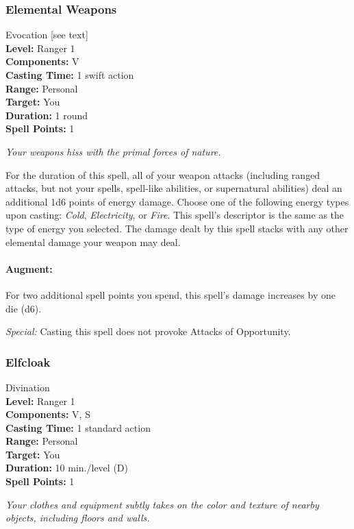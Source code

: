 \subsubsection{Elemental Weapons}
\label{Spell:ElementalWeapons}
Evocation [see text]
\\ \textbf{Level:} Ranger 1
\\ \textbf{Components:} V
\\ \textbf{Casting Time:} 1 swift action
\\ \textbf{Range:} Personal
\\ \textbf{Target:} You
\\ \textbf{Duration:} 1 round
\\ \textbf{Spell Points:} 1

\emph{Your weapons hiss with the primal forces of nature.}

For the duration of this spell, all of your weapon attacks (including ranged attacks, but not your spells, spell-like abilities, or supernatural abilities) deal an additional 1d6 points of energy damage. Choose one of the following energy types upon casting: \emph{Cold}, \emph{Electricity}, or \emph{Fire}.
This spell's descriptor is the same as the type of energy you selected. 
The damage dealt by this spell stacks with any other elemental damage your weapon may deal.

\paragraph{Augment:} For two additional spell points you spend, this spell's damage increases by one die (d6).

\emph{Special:} Casting this spell does not provoke Attacks of Opportunity.
\subsubsection{Elfcloak}
\label{Spell:Elfcloak}
Divination
\\ \textbf{Level:} Ranger 1
\\ \textbf{Components:} V, S
\\ \textbf{Casting Time:} 1 standard action
\\ \textbf{Range:} Personal
\\ \textbf{Target:} You
\\ \textbf{Duration:} 10 min./level (D)
\\ \textbf{Spell Points:} 1

\emph{Your clothes and equipment subtly takes on the color and texture of nearby objects, including floors and walls.}


